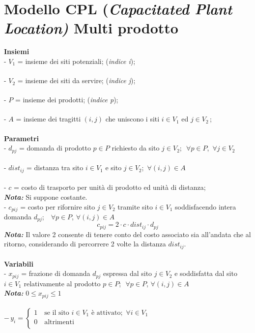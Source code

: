\documentclass[a4paper,12pt,titlepage]{article}
\begin{document}
	\section*{Modello CPL (\textit{Capacitated Plant Location)} Multi prodotto}
	\textbf{Insiemi}\\
	- $V_1$ = insieme dei siti potenziali;\,\,(\textit{indice i});\\
	\\
	- $V_2$ = insieme dei siti da servire;\,\,(\textit{indice j});\\
	\\
	- $P$ = insieme dei prodotti;\,\,(\textit{indice p});\\
	\\
	- $A$ = insieme dei tragitti $(i,j)$ che uniscono i siti $i\in V_1$ ed $j\in V_2$\,;\\
	\\
	\textbf{Parametri}\\
	- $d_{pj}$ = domanda di prodotto $p\in P$ richiesto da sito $j\in V_2$;\,\, $\forall p \in P$,\, $\forall j \in V_2$\\
	\\
	- $dist_{ij}$ = distanza tra sito $i\in V_1$ e sito $j\in V_2$;\,\,\,$\forall (i,j)\in A$\\
	\\
	- $c$ = costo di trasporto per unità di prodotto ed unità di distanza;\\
	\textbf{\textit{Nota:}} Si suppone costante.\\
	- $c_{pij}$ = costo per rifornire sito $j\in V_2$ tramite sito $i\in V_1$  soddisfacendo intera domanda $d_{pj}$; \,\, $\forall p \in P$,\,\,$\forall (i,j)\in A$\\
	\begin{equation*}
	c_{pij} = 2\cdot c\cdot dist_{ij}\cdot d_{pj}
	\end{equation*}
	\textbf{\textit{Nota:}} Il valore 2 consente di tenere conto del costo associato sia all'andata che al ritorno, considerando di percorrere 2 volte la distanza $dist_{ij}$.\\
	\\
	\textbf{Variabili}\\
	- $x_{pij}$ = frazione di domanda $d_{pj}$ espressa dal sito $j\in V_2$ e soddisfatta dal sito $i\in V_1$ relativamente al prodotto $p\in P$;\,\, $\forall p \in P$,\,\,$\forall (i,j)\in A$\\
	\textbf{\textit{Nota:}} $0 \leq x_{pij}\leq 1$\\
	\\
	\[
	-\,y_{i}=
	\left\{
	\begin{array}{ll}
	1\quad\mbox{se il sito $i\in V_1$ è attivato};\,\,\forall i\in V_1 \qquad\qquad\qquad\qquad\qquad\qquad\qquad\qquad\qquad \\
	0\quad\mbox{altrimenti}\\
	\end{array}
	\right.
	\]
	
\end{document}
